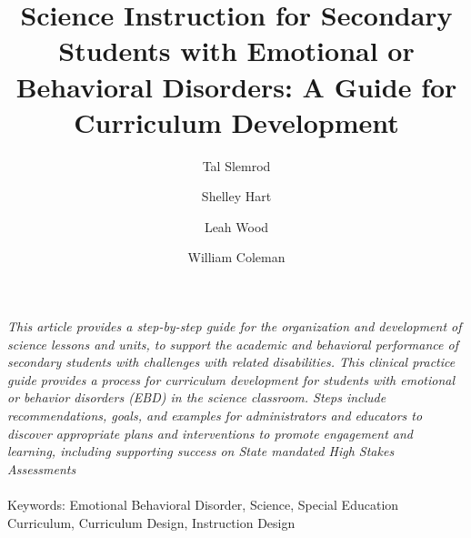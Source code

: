 \documentclass[11.5pt]{sig-alternate} %
\makeatletter
\let\oldabstract\abstract
\let\oldendabstract\endabstract
\renewenvironment{abstract} %
{\renewenvironment{quotation}%
               {\list{}{\addtolength{\leftmargin}{1em} %
                        \listparindent 1.5em%
                        \itemindent    \listparindent%
                        \rightmargin   \leftmargin%
                        \parsep        \z@ \@plus\p@}%
                \item\relax}%
               {\endlist}%
\oldabstract}
{\oldendabstract}
\makeatother
\begin{document}
\title{Science Instruction for Secondary Students with Emotional or Behavioral Disorders: A Guide for Curriculum Development}

\author[1]{\large \color{blue}Tal Slemrod}
\author[1]{\large \color{blue}Shelley Hart}
\author[1]{\large \color{blue}Leah Wood}
\author[1]{\large \color{blue}William Coleman}


\toappear{}
\maketitle
\begin{@twocolumnfalse} 
\begin{abstract}
\item 
\textit {This article provides a step-by-step guide for the organization and development of science lessons and units, to support the academic and behavioral performance of secondary students with challenges with related disabilities. This clinical practice guide provides a process for curriculum development for students with emotional or behavior disorders (EBD) in the science classroom. Steps include recommendations, goals, and examples for administrators and educators to discover appropriate plans and interventions to promote engagement and learning, including supporting success on State mandated High Stakes Assessments}
\\ \\
Keywords: Emotional Behavioral Disorder, Science, Special Education Curriculum, Curriculum Design, Instruction Design
\end{abstract}
\end{@twocolumnfalse}

\end{document}
